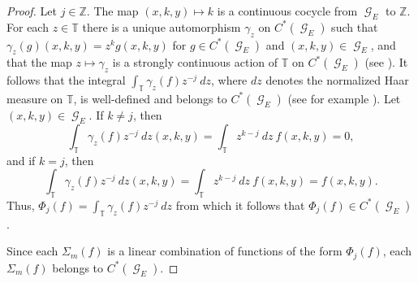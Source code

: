 \documentclass[12pt, a4paper]{amsart}
\numberwithin{equation}{section}
\theoremstyle{definition}
\theoremstyle{remark}
\begin{document}
\begin{proof}
	Let $j\in{\mathbb{Z}}$. The map $(x,k,y)\mapsto k$ is a continuous cocycle from ${\operatorname{\mathcal{G}}}_E$ to ${\mathbb{Z}}$. For each $z\in{\mathbb{T}}$ there is a unique automorphism $\gamma_z$ on $C^*({\operatorname{\mathcal{G}}}_E)$ such that $\gamma_z(g)(x,k,y)=z^kg(x,k,y)$ for $g\in C^*({\operatorname{\mathcal{G}}}_E)$ and $(x,k,y)\in{\operatorname{\mathcal{G}}}_E$, and that the map $z\mapsto\gamma_z$ is a strongly continuous action of ${\mathbb{T}}$ on $C^*({\operatorname{\mathcal{G}}}_E)$ (see \cite[Proposition II.5.1]{Ren}). It follows that the integral $\int_{\mathbb{T}}\gamma_z(f)z^{-j}\ dz$, where $dz$ denotes the normalized Haar measure on ${\mathbb{T}}$, is well-defined and belongs to $C^*({\operatorname{\mathcal{G}}}_E)$ (see for example \cite[Section C.2]{RW}). Let $(x,k,y)\in{\operatorname{\mathcal{G}}}_E$. If $k\ne j$, then 
	\begin{equation*}
		\int_{\mathbb{T}}\gamma_z(f)z^{-j}\ dz(x,k,y)=\int_{\mathbb{T}} z^{k-j}\ dz\ f(x,k,y)=0,
	\end{equation*}
	and if $k=j$, then 
	\begin{equation*}
		\int_{\mathbb{T}}\gamma_z(f)z^{-j}\ dz(x,k,y)=\int_{\mathbb{T}} z^{k-j}\ dz\ f(x,k,y)=f(x,k,y).
	\end{equation*}
	Thus, $\Phi_j(f)=\int_{\mathbb{T}}\gamma_z(f)z^{-j}\ dz$ from which it follows that $\Phi_j(f)\in C^*({\operatorname{\mathcal{G}}}_E)$.
	
	Since each $\Sigma_m(f)$ is a linear combination of functions of the form $\Phi_j(f)$, each $\Sigma_m(f)$ belongs to $C^*({\operatorname{\mathcal{G}}}_E)$.
	

\end{proof}
\end{document}
